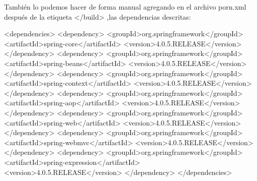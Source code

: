 Tambi\'en lo podemos hacer de forma manual  agregando en el archivo porn.xml despu\'es de la etiqueta </build> ,las dependencias descritas:

\begin{pyglist}[caption={porn.xml}]
<dependencies>
<dependency>
<groupId>org.springframework</groupId>
<artifactId>spring-core</artifactId>
<version>4.0.5.RELEASE</version>
</dependency>
<dependency>
<groupId>org.springframework</groupId>
<artifactId>spring-beans</artifactId>
<version>4.0.5.RELEASE</version>
</dependency>
<dependency>
<groupId>org.springframework</groupId>
<artifactId>spring-context</artifactId>
<version>4.0.5.RELEASE</version>
</dependency>
<dependency>
<groupId>org.springframework</groupId>
<artifactId>spring-aop</artifactId>
<version>4.0.5.RELEASE</version>
</dependency>
<dependency>
<groupId>org.springframework</groupId>
<artifactId>spring-web</artifactId>
<version>4.0.5.RELEASE</version>
</dependency>
<dependency>
<groupId>org.springframework</groupId>
<artifactId>spring-webmvc</artifactId>
<version>4.0.5.RELEASE</version>
</dependency>
<dependency>
<groupId>org.springframework</groupId>
<artifactId>spring-expression</artifactId>
<version>4.0.5.RELEASE</version>
</dependency>
</dependencies>
\end{pyglist}


